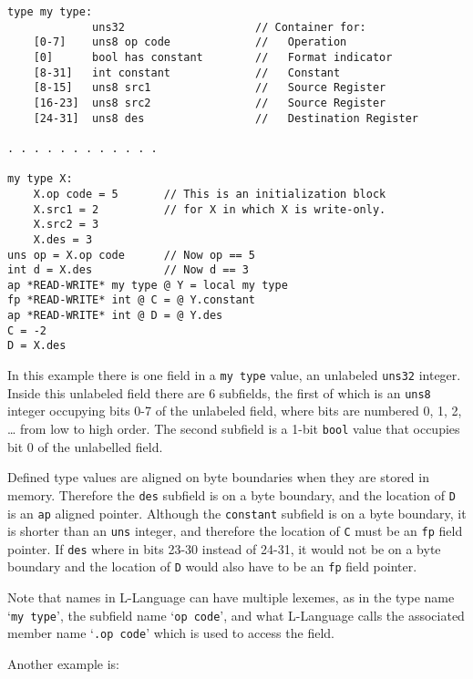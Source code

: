 \documentclass[12pt]{article}
\newenvironment{indpar}[1][0.3in]%
	{\begin{list}{}%
		     {\setlength{\itemsep}{0in}%
		      \setlength{\topsep}{0in}%
		      \setlength{\parsep}{1ex}%
		      \setlength{\labelwidth}{#1}%
		      \setlength{\leftmargin}{#1}%
		      \addtolength{\leftmargin}{\labelsep}}%
	 \item}%
	{\end{list}}
\begin{document}
\begin{indpar}\begin{verbatim}
type my type:
             uns32                    // Container for:
    [0-7]    uns8 op code             //   Operation
    [0]      bool has constant        //   Format indicator
    [8-31]   int constant             //   Constant
    [8-15]   uns8 src1                //   Source Register
    [16-23]  uns8 src2                //   Source Register
    [24-31]  uns8 des                 //   Destination Register

. . . . . . . . . . . .

my type X:
    X.op code = 5       // This is an initialization block
    X.src1 = 2          // for X in which X is write-only.
    X.src2 = 3
    X.des = 3
uns op = X.op code      // Now op == 5
int d = X.des           // Now d == 3
ap *READ-WRITE* my type @ Y = local my type
fp *READ-WRITE* int @ C = @ Y.constant
ap *READ-WRITE* int @ D = @ Y.des
C = -2
D = X.des
\end{verbatim}\end{indpar}

In this example there is one field in a {\tt my type} value,
an unlabeled {\tt uns32} integer.
Inside this unlabeled field there are 6 subfields, the first of which is
an {\tt uns8} integer occupying bits 0-7 of the unlabeled field,
where bits are numbered 0, 1, 2, \ldots{} from
low to high order.  The second subfield is a 1-bit {\tt bool}
value that occupies bit 0 of the unlabelled field.

Defined type values are aligned on byte boundaries when
they are stored in memory.  Therefore the {\tt des} subfield
is on a byte boundary, and
the location of {\tt D} is an {\tt ap} aligned pointer.  Although
the {\tt constant} subfield is on a byte boundary, it is
shorter than an {\tt uns} integer, and therefore the
location of {\tt C} must be an {\tt fp} field pointer.
If {\tt des} where in bits 23-30 instead of 24-31, it would
not be on a byte boundary and the location of {\tt D} would
also have to be an {\tt fp} field pointer.

Note that names in L-Language can have multiple lexemes, as in
the type name `{\tt my type}', the subfield name `{\tt op code}',
and what L-Language calls the
associated member name `{\tt .op code}' which is used to access
the field.

Another example is:
\end{document}
